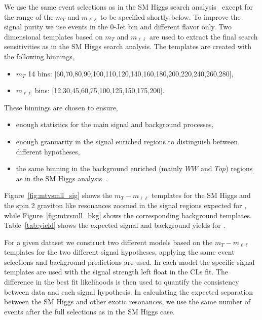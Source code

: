 We use the same event selections as in the SM Higgs search 
analysis~\cite{HWWHCP2012} except for the range of the 
$m_T$ and $m_{\ell\ell}$ to be specified shortly below. 
To improve the signal purity 
we use events in the 0-Jet bin and different flavor only. 
Two dimensional templates based on $m_T$ and $m_{\ell\ell}$ 
are used to extract the final search sensitivities as in the 
SM Higgs search analysis.
The templates are created with the following binnings,
\begin{itemize}
\item $m_T$ 14 bins: [60,70,80,90,100,110,120,140,160,180,200,220,240,260,280],
\item $m_{\ell\ell}$ bins: [12,30,45,60,75,100,125,150,175,200].
\end{itemize}
These binnings are chosen to ensure, 
\begin{itemize}
\item enough statistics for the main signal and background processes, 
\item enough granuarity in the signal enriched regions to distinguish between 
different hypotheses, 
\item the same binning in the background enriched (mainly $WW$ and $Top$) regions 
as in the SM Higgs analysis~\cite{HWWHCP2012}. 
\end{itemize}
Figure~\ref{fig:mtvsmll_sig} shows the $m_T-m_{\ell\ell}$ templates for the SM Higgs 
and the spin 2 graviton like resonances zoomed in the signal regions expected for \intlumiEightTeV, while 
Figure~\ref{fig:mtvsmll_bkg} shows the corresponding background templates. 
Table~\ref{tab:yield} shows the expected signal and background yields 
for \intlumiEightTeV. 

For a given dataset we construct two different models based on the $m_T-m_{\ell\ell}$ 
templates for the two different signal hypotheses, applying the 
same event selections and background predictions are used.  
In each model the specific signal templates are used with the 
signal strength left float in the CLs fit. 
The difference in the best fit likelihoods is then used 
to quantify the consistency between data and each signal hypothesis. 
In calculating the expected separation between the SM Higgs and other 
exotic resonances, we use the same number of events after the full selections as in 
the SM Higgs case. 

